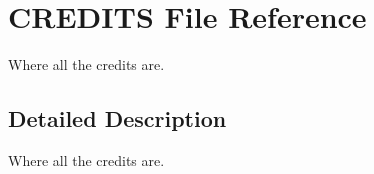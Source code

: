 \section{C\-R\-E\-D\-I\-T\-S File Reference}
\label{CREDITS}


Where all the credits are.  




\subsection{Detailed Description}
Where all the credits are. 